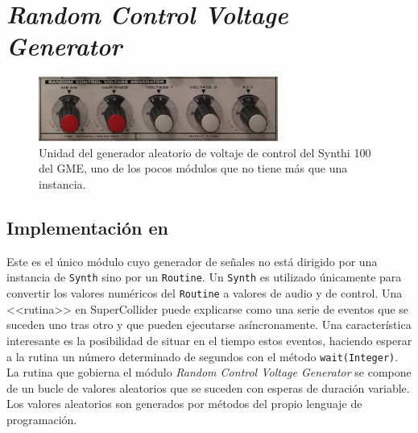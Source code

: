 \section[Random C. V. Generator]{\textit{Random Control Voltage Generator}}
\label{sec:random_generator}



\begin{figure}
	\centering
	\includegraphics[width=0.7\textwidth]{images/random_generator}
	\caption[\textit{Random Voltage Control Generator}]{Unidad del generador aleatorio de voltaje de control del Synthi 100 del GME, uno de los pocos módulos que no tiene más que una instancia.}
	\label{fig:random_generator}
\end{figure}

\subsection{Implementación en \appName}
Este es el único módulo cuyo generador de señales no está dirigido por una instancia de \texttt{Synth} sino por un \texttt{Routine}. Un \texttt{Synth} es utilizado únicamente para convertir los valores numéricos del \texttt{Routine} a valores de audio y de control. Una <<rutina>> en SuperCollider puede explicarse como una serie de eventos que se suceden uno tras otro y que pueden ejecutarse asíncronamente. Una característica interesante es la posibilidad de situar en el tiempo estos eventos, haciendo esperar a la rutina un número determinado de segundos con el método \texttt{wait(Integer)}. La rutina que gobierna el módulo \textit{Random Control Voltage Generator} se compone de un bucle de valores aleatorios que se suceden con esperas de duración variable. Los valores aleatorios son generados por métodos del propio lenguaje de programación.